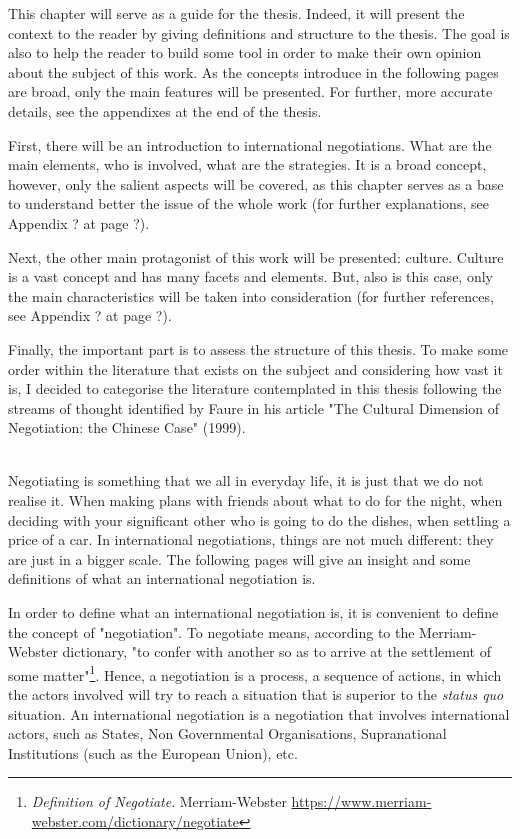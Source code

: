 \documentclass[../main.tex]{subfiles}
\begin{document}
This chapter will serve as a guide for the thesis. Indeed, it will present the context to the reader by giving definitions and structure to the thesis. The goal is also to help the reader to build some tool in order to make their own opinion about the subject of this work. As the concepts introduce in the following pages are broad, only the main features will be presented. For further, more accurate details, see the appendixes at the end of the thesis.

First, there will be an introduction to international negotiations. What are the main elements, who is involved, what are the strategies. It is a broad concept, however, only the salient aspects will be covered, as this chapter serves as a base to understand better the issue of the whole work (for further explanations, see Appendix ? at page ?).

Next, the other main protagonist of this work will be presented: culture. Culture is a vast concept and has many facets and elements. But, also is this case, only the main characteristics will be taken into consideration (for further references, see Appendix ? at page ?).

Finally, the important part is to assess the structure of this thesis.
To make some order within the literature that exists on the subject and considering how vast it is, I decided to categorise the literature contemplated %
in this thesis following the streams of thought identified by Faure in his article "The Cultural Dimension of Negotiation: the Chinese Case" (1999).\\
\pagebreak

\\

Negotiating is something that we all in everyday life, it is just that we do not realise it. When making plans with friends about what to do for the night, when deciding with your significant other who is going to do the dishes, when settling a price of a car.
In international negotiations, things are not much different: they are just in a bigger scale. The following pages will give an insight and some definitions of what an international negotiation is.

In order to define what an international negotiation is, it is convenient to define the concept of "negotiation". To negotiate means, according to the Merriam-Webster dictionary, "to confer with another so as to arrive at the settlement of some matter"\footnote{\textit{Definition of Negotiate}. Merriam-Webster \url{https://www.merriam-webster.com/dictionary/negotiate}}. Hence, a negotiation is a process, a sequence of actions, in which the actors involved will try to reach a situation that is superior to the \textit{status quo} situation. An international negotiation is a negotiation that involves international actors, such as States, Non Governmental Organisations, Supranational Institutions (such as the European Union), etc.
\end{document}

